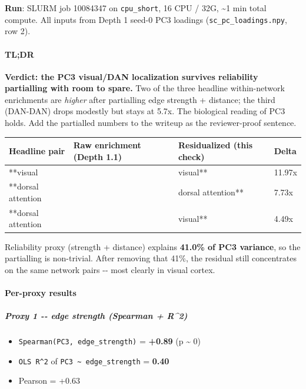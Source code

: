 \textbf{Run}: SLURM job 10084347 on \texttt{cpu\_short}, 16 CPU / 32G, \textasciitilde1 min total compute. All inputs from Depth 1 seed-0 PC3 loadings (\texttt{sc\_pc\_loadings.npy}, row 2).

\paragraph{TL;DR}\label{tldr-2}

\textbf{Verdict: the PC3 visual/DAN localization survives reliability partialling with room to spare.} Two of the three headline within-network enrichments are \emph{higher} after partialling edge strength + distance; the third (DAN-DAN) drops modestly but stays at 5.7x. The biological reading of PC3 holds. Add the partialled numbers to the writeup as the reviewer-proof sentence.

{\def\LTcaptype{none} %
\begin{longtable}[]{@{}llll@{}}
\toprule\noalign{}
Headline pair & Raw enrichment (Depth 1.1) & Residualized (this check) & Delta \\
\midrule\noalign{}
\endhead
\bottomrule\noalign{}
\endlastfoot
**visual & & visual** & 11.97x \\
**dorsal attention & & dorsal attention** & 7.73x \\
**dorsal attention & & visual** & 4.49x \\
\end{longtable}
}

Reliability proxy (strength + distance) explains \textbf{41.0\% of \textbar PC3\textbar{} variance}, so the partialling is non-trivial. After removing that 41\%, the residual still concentrates on the same network pairs -\/- most clearly in visual cortex.

\paragraph{Per-proxy results}\label{per-proxy-results}

\subparagraph{Proxy 1 -\/- edge strength (Spearman + R\^{}2)}\label{proxy-1----edge-strength-spearman--r2}

\begin{itemize}
\tightlist
\item
  \texttt{Spearman(\textbar{}PC3\textbar{},\ edge\_strength)} = \textbf{+0.89} (p \textasciitilde{} 0)
\item
  \texttt{OLS\ R\^{}2} of \texttt{\textbar{}PC3\textbar{}\ \textasciitilde{}\ edge\_strength} = \textbf{0.40}
\item
  Pearson = +0.63
\end{itemize}

